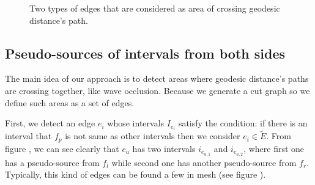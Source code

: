 \documentclass[a4paper,twoside]{article}
\begin{document}
\begin{figure}[h!]
	\centering		
	\hspace{0pt}

	\caption[]{Two types of edges that are considered as area of crossing geodesic distance's path.}
	\label{fig:fig-two-type-edges}
\end{figure}


\subsection{Pseudo-sources of intervals from both sides}
\label{subsec:pseudo-sources laid on both side of adjacent faces}
The main idea of our approach is to detect areas where geodesic distance's paths are crossing together, like wave occlusion. Because we generate a cut graph so we define such areas as a set of edges.

First, we detect an edge $e_i$ whose intervals $I_{e_i}$ satisfy the condition: if there is an interval that $f_p$ is not same as other intervals then we consider $e_i \in \tilde{E}$. From figure , we can see clearly that $e_a$ has two intervals $i_{e_{a,1}}$ and $i_{e_{a,2}}$, where first one has a pseudo-source from $f_l$ while second one has another pseudo-source from $f_r$. Typically, this kind of edges can be found a few in mesh (see figure ). 
\end{document}
